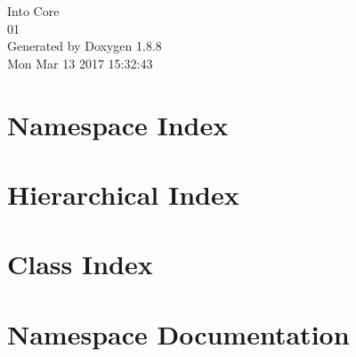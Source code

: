 \documentclass[twoside]{book}
\newcommand{\+}{\discretionary{\mbox{\scriptsize$\hookleftarrow$}}{}{}}
\newcommand{\clearemptydoublepage}{%
  \newpage{\pagestyle{empty}\cleardoublepage}%
}
\begin{document}
\hypersetup{pageanchor=false,
             bookmarks=true,
             bookmarksnumbered=true,
             pdfencoding=unicode
            }
\begin{titlepage}
\vspace*{7cm}
\begin{center}%
{\Large Into Core \\[1ex]\large 01 }\\
\vspace*{1cm}
{\large Generated by Doxygen 1.8.8}\\
\vspace*{0.5cm}
{\small Mon Mar 13 2017 15:32:43}\\
\end{center}
\end{titlepage}
\clearemptydoublepage
\tableofcontents
\clearemptydoublepage
{}
\hypersetup{pageanchor=true}

\chapter{Namespace Index}

\chapter{Hierarchical Index}

\chapter{Class Index}

\chapter{Namespace Documentation}




\end{document}

